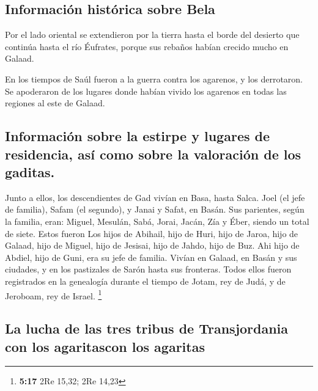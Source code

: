 \hypertarget{informaciuxf3n-histuxf3rica-sobre-bela}{%
\subsection{Información histórica sobre
Bela}\label{informaciuxf3n-histuxf3rica-sobre-bela}}

 Por el lado oriental se extendieron por la tierra hasta
el borde del desierto que continúa hasta el río Éufrates, porque sus
rebaños habían crecido mucho en Galaad.

 En los tiempos de Saúl fueron a la guerra contra los
agarenos, y los derrotaron. Se apoderaron de los lugares donde habían
vivido los agarenos en todas las regiones al este de Galaad.

\hypertarget{informaciuxf3n-sobre-la-estirpe-y-lugares-de-residencia-asuxed-como-sobre-la-valoraciuxf3n-de-los-gaditas.}{%
\subsection{Información sobre la estirpe y lugares de residencia, así
como sobre la valoración de los
gaditas.}\label{informaciuxf3n-sobre-la-estirpe-y-lugares-de-residencia-asuxed-como-sobre-la-valoraciuxf3n-de-los-gaditas.}}

 Junto a ellos, los descendientes de Gad vivían en Basa,
hasta Salca.  Joel (el jefe de familia), Safam (el
segundo), y Janai y Safat, en Basán.  Sus parientes,
según la familia, eran: Miguel, Mesulán, Sabá, Jorai, Jacán, Zía y Éber,
siendo un total de siete.  Estos fueron Los hijos de
Abihail, hijo de Huri, hijo de Jaroa, hijo de Galaad, hijo de Miguel,
hijo de Jesisai, hijo de Jahdo, hijo de Buz.  Ahi hijo de
Abdiel, hijo de Guni, era su jefe de familia.  Vivían en
Galaad, en Basán y sus ciudades, y en los pastizales de Sarón hasta sus
fronteras.  Todos ellos fueron registrados en la
genealogía durante el tiempo de Jotam, rey de Judá, y de Jeroboam, rey
de Israel. \footnote{\textbf{5:17} 2Re 15,32; 2Re 14,23}

\hypertarget{la-lucha-de-las-tres-tribus-de-transjordania-con-los-agaritascon-los-agaritas}{%
\subsection{La lucha de las tres tribus de Transjordania con los
agaritascon los
agaritas}\label{la-lucha-de-las-tres-tribus-de-transjordania-con-los-agaritascon-los-agaritas}}

